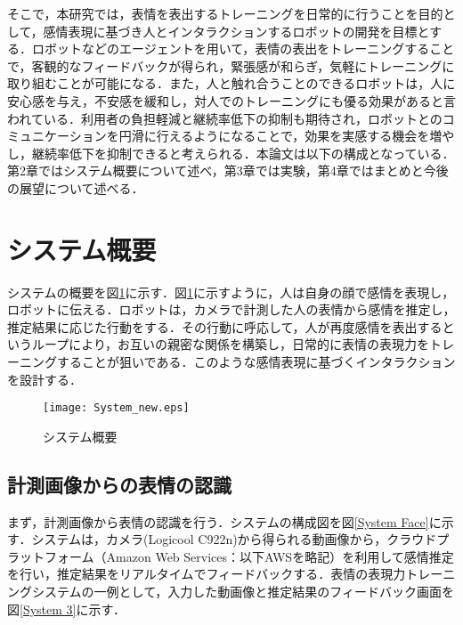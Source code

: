 \documentclass[titlepage]{jarticle}
\begin{document}
そこで，本研究では，表情を表出するトレーニングを日常的に行うことを目的として，感情表現に基づき人とインタラクションするロボットの開発を目標とする．ロボットなどのエージェントを用いて，表情の表出をトレーニングすることで，客観的なフィードバックが得られ，緊張感が和らぎ，気軽にトレーニングに取り組むことが可能になる．また，人と触れ合うことのできるロボットは，人に安心感を与え，不安感を緩和し，対人でのトレーニングにも優る効果があると言われている\cite{hayashi}\cite{harada}．利用者の負担軽減と継続率低下の抑制も期待され，ロボットとのコミュニケーションを円滑に行えるようになることで，効果を実感する機会を増やし，継続率低下を抑制できると考えられる．本論文は以下の構成となっている．第2章ではシステム概要について述べ，第3章では実験，第4章ではまとめと今後の展望について述べる．
\newpage
\section{システム概要}
システムの概要を図\ref{System Overview}に示す．図\ref{System Overview}に示すように，人は自身の顔で感情を表現し，ロボットに伝える．ロボットは，カメラで計測した人の表情から感情を推定し，推定結果に応じた行動をする．その行動に呼応して，人が再度感情を表出するというループにより，お互いの親密な関係を構築し，日常的に表情の表現力をトレーニングすることが狙いである．このような感情表現に基づくインタラクションを設計する．


\begin{figure}[h]
\begin{center}
\texttt{[image: System\_new.eps]}
\end{center}
\caption{システム概要}
\label{System Overview} %
\end{figure}



\subsection{計測画像からの表情の認識}
まず，計測画像から表情の認識を行う．システムの構成図を図\ref{System Face}に示す．システムは，カメラ(Logicool C922n)から得られる動画像から，クラウドプラットフォーム（Amazon Web Services：以下AWSを略記）を利用して感情推定を行い，推定結果をリアルタイムでフィードバックする．表情の表現力トレーニングシステムの一例として，入力した動画像と推定結果のフィードバック画面を図\ref{System 3}に示す．
\end{document}
